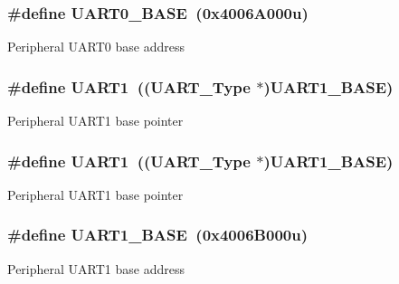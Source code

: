 \subsubsection[{\texorpdfstring{U\+A\+R\+T0\+\_\+\+B\+A\+SE}{UART0_BASE}}]{\setlength{\rightskip}{0pt plus 5cm}\#define U\+A\+R\+T0\+\_\+\+B\+A\+SE~(0x4006\+A000u)}\hypertarget{group__UART__Peripheral__Access__Layer_ga7a07348b4332ff6b88abf6092347deba}{}\label{group__UART__Peripheral__Access__Layer_ga7a07348b4332ff6b88abf6092347deba}
Peripheral U\+A\+R\+T0 base address 
\subsubsection[{\texorpdfstring{U\+A\+R\+T1}{UART1}}]{\setlength{\rightskip}{0pt plus 5cm}\#define U\+A\+R\+T1~(({\bf U\+A\+R\+T\+\_\+\+Type} $\ast$){\bf U\+A\+R\+T1\+\_\+\+B\+A\+SE})}\hypertarget{group__UART__Peripheral__Access__Layer_ga8d69bf04d07af4fbbab5a8bd291f65ff}{}\label{group__UART__Peripheral__Access__Layer_ga8d69bf04d07af4fbbab5a8bd291f65ff}
Peripheral U\+A\+R\+T1 base pointer 
\subsubsection[{\texorpdfstring{U\+A\+R\+T1}{UART1}}]{\setlength{\rightskip}{0pt plus 5cm}\#define U\+A\+R\+T1~(({\bf U\+A\+R\+T\+\_\+\+Type} $\ast$){\bf U\+A\+R\+T1\+\_\+\+B\+A\+SE})}\hypertarget{group__UART__Peripheral__Access__Layer_ga8d69bf04d07af4fbbab5a8bd291f65ff}{}\label{group__UART__Peripheral__Access__Layer_ga8d69bf04d07af4fbbab5a8bd291f65ff}
Peripheral U\+A\+R\+T1 base pointer 
\subsubsection[{\texorpdfstring{U\+A\+R\+T1\+\_\+\+B\+A\+SE}{UART1_BASE}}]{\setlength{\rightskip}{0pt plus 5cm}\#define U\+A\+R\+T1\+\_\+\+B\+A\+SE~(0x4006\+B000u)}\hypertarget{group__UART__Peripheral__Access__Layer_ga383bf0c4670c3a7fa72df80f66331a46}{}\label{group__UART__Peripheral__Access__Layer_ga383bf0c4670c3a7fa72df80f66331a46}
Peripheral U\+A\+R\+T1 base address 
